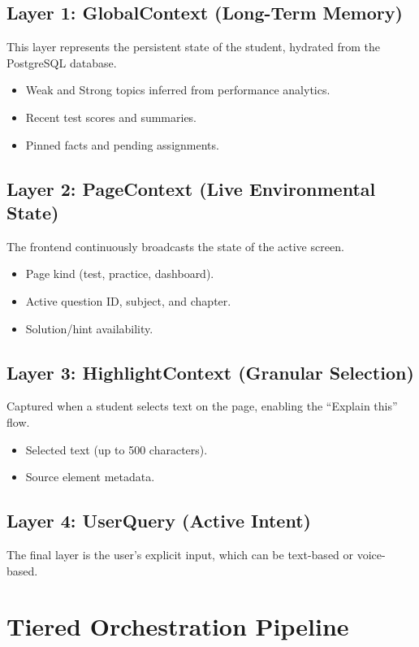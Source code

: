 \subsection{Layer 1: GlobalContext (Long-Term Memory)}
This layer represents the persistent state of the student, hydrated from the PostgreSQL database.
\begin{itemize}
    \item Weak and Strong topics inferred from performance analytics.
    \item Recent test scores and summaries.
    \item Pinned facts and pending assignments.
\end{itemize}

\subsection{Layer 2: PageContext (Live Environmental State)}
The frontend continuously broadcasts the state of the active screen.
\begin{itemize}
    \item Page kind (test, practice, dashboard).
    \item Active question ID, subject, and chapter.
    \item Solution/hint availability.
\end{itemize}

\subsection{Layer 3: HighlightContext (Granular Selection)}
Captured when a student selects text on the page, enabling the ``Explain this'' flow.
\begin{itemize}
    \item Selected text (up to 500 characters).
    \item Source element metadata.
\end{itemize}

\subsection{Layer 4: UserQuery (Active Intent)}
The final layer is the user's explicit input, which can be text-based or voice-based.

\section{Tiered Orchestration Pipeline}

